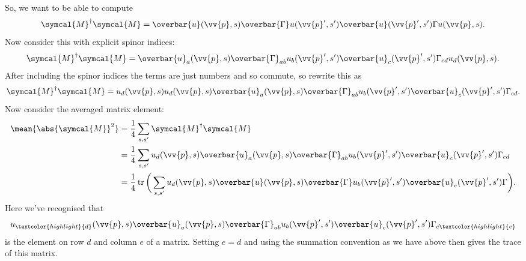 \documentclass[fleqn]{NotesClass}
\newcommand{\hermit}{{\dagger}}
\newcommand{\amplitude}{\symcal{M}}
\DeclareMathOperator{\tr}{tr}
\newcommand{\diracadjoint}[1]{\overbar{#1}}
\begin{document}
    So, we want to be able to compute
    \begin{equation}
        \amplitude^\hermit \amplitude = \diracadjoint{u}(\vv{p}, s) \diracadjoint{\Gamma} u(\vv{p}', s') \diracadjoint{u}(\vv{p}', s') \Gamma u(\vv{p}, s).
    \end{equation}
    Now consider this with explicit spinor indices:
    \begin{align}
        \amplitude^\hermit \amplitude = \diracadjoint{u}_a(\vv{p}, s) \diracadjoint{\Gamma}_{ab} u_b(\vv{p}', s') \diracadjoint{u}_c(\vv{p}', s') \Gamma_{cd} u_d(\vv{p}, s).
    \end{align}
    After including the spinor indices the terms are just numbers and so commute, so rewrite this as
    \begin{equation}
        \amplitude^\hermit \amplitude = u_d(\vv{p}, s) u_d(\vv{p}, s) \diracadjoint{u}_a(\vv{p}, s) \diracadjoint{\Gamma}_{ab} u_b(\vv{p}', s') \diracadjoint{u}_c(\vv{p}', s') \Gamma_{cd}.
    \end{equation}
    Now consider the averaged matrix element:
    \begin{align}
        \mean{\abs{\amplitude}^2} &= \frac{1}{4} \sum_{s, s'} \amplitude^\hermit \amplitude\\
        &= \frac{1}{4} \sum_{s, s'} u_d(\vv{p}, s) \diracadjoint{u}_a(\vv{p}, s) \diracadjoint{\Gamma}_{ab} u_b(\vv{p}', s') \diracadjoint{u}_c(\vv{p}', s') \Gamma_{cd}\\
        &= \frac{1}{4} \tr\bigg( \sum_{s, s'} u_d(\vv{p}, s) \diracadjoint{u}(\vv{p}, s) \diracadjoint{\Gamma} u_b(\vv{p}', s') \diracadjoint{u}_c(\vv{p}', s') \Gamma \bigg).
    \end{align}
    Here we've recognised that
    \begin{equation}
        u_{\textcolor{highlight}{d}}(\vv{p}, s) \diracadjoint{u}_a(\vv{p}, s) \diracadjoint{\Gamma}_{ab} u_b(\vv{p}', s') \diracadjoint{u}_c(\vv{p}', s') \Gamma_{c\textcolor{highlight}{e}}
    \end{equation}
    is the element on row \(d\) and column \(e\) of a matrix.
    Setting \(e = d\) and using the summation convention as we have above then gives the trace of this matrix.
    
\end{document}
